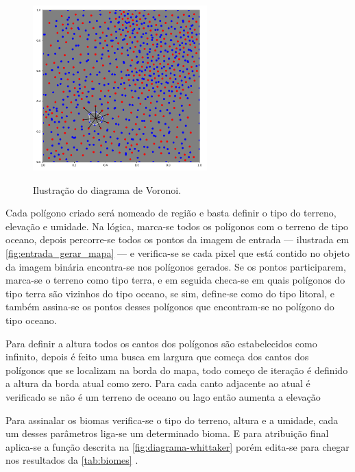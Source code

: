 \begin{figure}[!ht]
	\centering
    \caption{Ilustração do diagrama de Voronoi.}
	\includegraphics[width=0.6\textwidth]{figures/diagrama_voronoi_pontos.png}
	\label{fig:diagrama_voronoi_pontos}
\end{figure}

Cada polígono criado será nomeado de região e basta definir o tipo do terreno, elevação e umidade. Na lógica, marca-se todos os polígonos com o terreno de tipo oceano, depois percorre-se todos os pontos da imagem de entrada — ilustrada em \cref{fig:entrada_gerar_mapa} — e verifica-se se cada pixel que está contido no objeto da imagem binária encontra-se nos polígonos gerados. Se os pontos participarem, marca-se o terreno como tipo terra, e em seguida checa-se em quais polígonos do tipo terra são vizinhos do tipo oceano, se sim, define-se como do tipo litoral, e também assina-se os pontos desses polígonos que encontram-se no polígono do tipo oceano.

Para definir a altura todos os cantos dos polígonos são estabelecidos como infinito, depois é feito uma busca em largura que começa dos cantos dos polígonos que se localizam na borda do mapa, todo começo de iteração é definido a altura da borda atual como zero. Para cada canto adjacente ao atual é verificado se não é um terreno de oceano ou lago então aumenta a elevação

Para assinalar os biomas verifica-se o tipo do terreno, altura e a umidade, cada um desses parâmetros liga-se um determinado bioma. E para atribuição final aplica-se a função descrita na \cref{fig:diagrama-whittaker} porém edita-se para chegar nos resultados da \cref{tab:biomes} \space\cite{amitp2010}.

